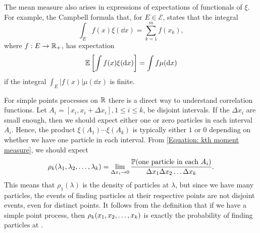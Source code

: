 The mean measure also arises in expressions of expectations of functionals of $\xi$. For example, the Campbell formula that, for $E \in \mathcal{E}$, states that the integral
\begin{equation}
	\int_E f(x) \xi(\dd x) = \sum_{k=1}^{m} f(x_k),
\end{equation}
where $f: E \rightarrow \mathbb{R}_+$, has expectation
\begin{equation}
	\mathbb{E}\left[ \int f(x) \xi(\mathrm{d} x) \right] = \int f \mu(\mathrm{d} x)
\end{equation}
if the integral $\int_E |f(x)| \mu(\dd x)$ is finite.  

For simple points processes on $\mathbb{R}$ there is a direct way to understand correlation functions. Let $A_i = [x_i, x_i + \Delta x_i], 1 \leq i \leq k$, be disjoint intervals. If the $\Delta x_i$ are small enough, then we should expect either one or zero particles in each interval $A_i$. Hence, the product $\xi(A_1) \cdots \xi(A_k)$ is typically either $1$ or $0$ depending on whether we have one particle in each interval. From \eqref{Equation: kth moment measure}, we should expect
\begin{equation}
	\rho_k(\mmany{\lambda}{k}) = \lim_{\Delta x_i \rightarrow 0} \frac{\mathbb{P}(\text{one particle in each} \ A_i)}{\mcmany{\Delta x}{k}{}}.
\end{equation}
This means that $\rho_1(\lambda)$ is the density of particles at $\lambda$, but since we have many particles, the events of finding particles at their respective points are not disjoint events, even for distinct points. It follows from the definition that if we have a simple point process, then $\rho_k(x_1, x_2, \dots, x_k)$ is exactly the probability of finding particles at .

